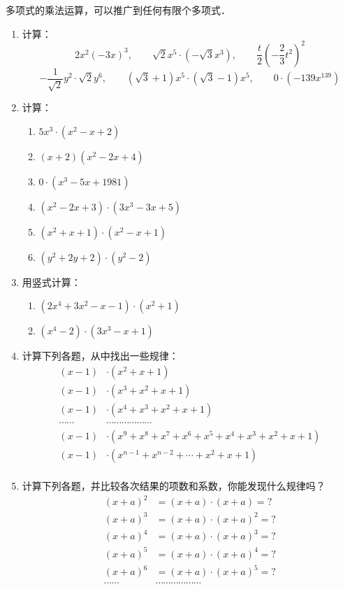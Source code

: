 多项式的乘法运算，可以推广到任何有限个多项式．

\begin{ex}
\begin{enumerate}
    \item 计算：
    \[2x^2(-3x)^3,\qquad \sqrt{2}x^5\cdot (-\sqrt{3}x^3),\qquad \frac{t}{2}\left(-\frac{2}{3}t^2\right)^2 \]
    \[-\frac{1}{\sqrt{2}}y^2\cdot \sqrt{2}y^6,\qquad (\sqrt{3}+1)x^5\cdot (\sqrt{3}-1)x^5,\qquad 0\cdot (-139x^{139}) \]
    \item 计算：
    \begin{multicols}{2}
    \begin{enumerate}
        \item $5x^3\cdot (x^2-x+2)$
        \item $(x+2)(x^2-2x+4)$
        \item $0\cdot (x^3-5x+1981)$
        \item $(x^2-2x+3)\cdot (3x^3-3x+5)$
        \item $(x^2+x+1)\cdot (x^2-x+1)$
        \item $(y^2+2y+2)\cdot(y^2-2)$
    \end{enumerate}
    \end{multicols}
    \item 用竖式计算：
\begin{enumerate}
    \item $(2x^4+3x^2-x-1)\cdot (x^2+1)$
    \item $(x^4-2)\cdot (3x^3-x+1)$
\end{enumerate}
\item 计算下列各题，从中找出一些规律：
\[\begin{split}
    (x-1)&\cdot (x^2+x+1)\\
    (x-1)&\cdot (x^3+x^2+x+1)\\
    (x-1)&\cdot (x^4+x^3+x^2+x+1)\\
    \cdots\cdots & \cdots\cdots \cdots\cdots \cdots\cdots \\
    (x-1)&\cdot (x^9+x^8+x^7+x^6+x^5+x^4+x^3+x^2+x+1)\\
    (x-1)&\cdot (x^{n-1}+x^{n-2}+\cdots+x^2+x+1)\\
\end{split}\]

\item 计算下列各题，并比较各次结果的项数和系数，你能发现什么规律吗？
\[\begin{split}
    (x+a)^2&=(x+a)\cdot (x+a)=?\\
    (x+a)^3&=(x+a)\cdot (x+a)^2=?\\
    (x+a)^4&=(x+a)\cdot (x+a)^3=?\\
    (x+a)^5&=(x+a)\cdot (x+a)^4=?\\
    (x+a)^6&=(x+a)\cdot (x+a)^5=?\\
\cdots\cdots &\cdots\cdots \cdots\cdots \cdots\cdots \\
\end{split}\]
\end{enumerate}
\end{ex}

